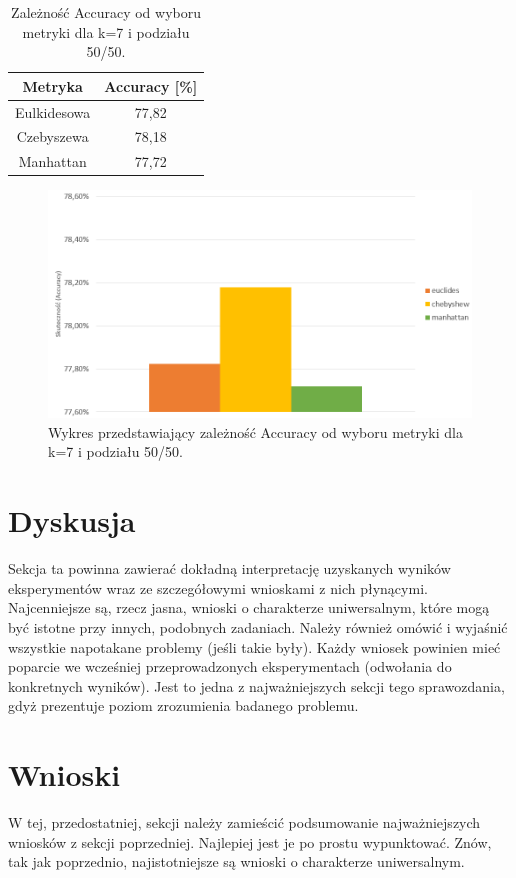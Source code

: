 \documentclass{classrep}
\begin{document}
\begin{table}[h!]
	\centering
	\begin{tabular} {c c}
		\hline
		\textbf{Metryka} & \textbf{Accuracy [\%]} \\ [0.5ex] 
		\hline
		\hline 
		Eulkidesowa & 77,82 \\ 
		Czebyszewa & 78,18 \\
		Manhattan &77,72 \\
		\hline
	\end{tabular}
	\caption{Zależność Accuracy od wyboru metryki dla k=7 i podziału 50/50. }
\end{table}

\begin{figure}[h!]
    \centering
    \includegraphics[width=1\textwidth]{metryki.png}
    \caption{Wykres przedstawiający zależność Accuracy od wyboru metryki dla k=7 i podziału 50/50.}
    \label{metryki}
\end{figure}

\newpage
\section{Dyskusja} %
{\color{blue}
Sekcja ta powinna zawierać dokładną interpretację uzyskanych wyników
eksperymentów wraz ze szczegółowymi wnioskami z nich płynącymi. Najcenniejsze
są, rzecz jasna, wnioski o charakterze uniwersalnym, które mogą być istotne
przy innych, podobnych zadaniach. Należy również omówić i wyjaśnić wszystkie
napotakane problemy (jeśli takie były). Każdy wniosek powinien mieć poparcie
we wcześniej przeprowadzonych eksperymentach (odwołania do konkretnych
wyników). Jest to jedna z najważniejszych sekcji tego sprawozdania, gdyż
prezentuje poziom zrozumienia badanego problemu.}
\section{Wnioski}
{\color{blue}W tej, przedostatniej, sekcji należy zamieścić podsumowanie
najważniejszych wniosków z sekcji poprzedniej. Najlepiej jest je po prostu
wypunktować. Znów, tak jak poprzednio, najistotniejsze są wnioski o
charakterze uniwersalnym.}
\end{document}
